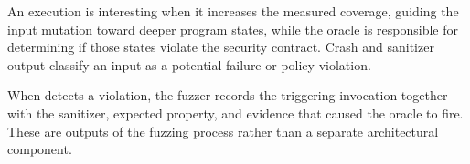 An execution is interesting when it increases the measured coverage, guiding the input mutation toward deeper program states, while the oracle is responsible for determining if those states violate the security contract. Crash and sanitizer output classify an input as a potential failure or policy violation.

When \project{} detects a violation, the fuzzer records the triggering
invocation together with the sanitizer, expected property, and evidence that
caused the oracle to fire. These are outputs of the fuzzing process rather than
a separate architectural component.






